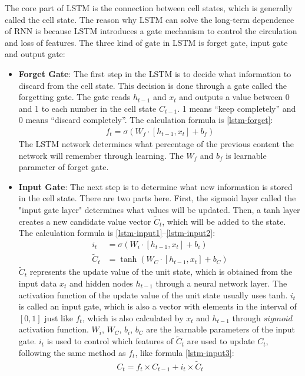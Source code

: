 The core part of LSTM is the connection between cell states, which is generally called the cell state. The reason why LSTM can solve the long-term dependence of RNN is because LSTM introduces a gate mechanism to control the circulation and loss of features. The three kind of gate in LSTM is forget gate, input gate and output gate:
\begin{itemize}
	\item \textbf{Forget Gate}: The first step in the LSTM is to decide what information to discard from the cell state. This decision is done through a gate called the forgetting gate. The gate reads \(h_{t-1}\) and \(x_t\) and outputs a value between 0 and 1 to each number in the cell state \(C_{t-1}\). 1 means ``keep completely'' and 0 means ``discard completely''. The calculation formula is \ref{lstm-forget}:
	      \begin{align}
		      f_{t}=\sigma(W_{f} \cdot[h_{t-1}, x_{t}]+b_{f}) \label{lstm-forget}
	      \end{align}
	      The LSTM network determines what percentage of the previous content the network will remember through learning. The \(W_f\) and \(b_f\) is learnable parameter of forget gate.
	\item \textbf{Input Gate}: The next step is to determine what new information is stored in the cell state. There are two parts here. First, the sigmoid layer called the "input gate layer" determines what values will be updated. Then, a tanh layer creates a new candidate value vector \(\widetilde{C}_t\), which will be added to the state. The calculation formula is \ref{lstm-input1}--\ref{lstm-input2}:
	      \begin{align}
		      i_{t}         & =\sigma(W_{i} \cdot[h_{t-1}, x_{t}]+b_{i}) \label{lstm-input1} \\
		      \tilde{C}_{t} & =\tanh (W_{C} \cdot[h_{t-1}, x_{t}]+b_{C}) \label{lstm-input2}
	      \end{align}
	      \(\tilde{C}_{t}\) represents the update value of the unit state, which is obtained from the input data \(x_t\) and hidden nodes \(h_{t-1}\) through a neural network layer. The activation function of the update value of the unit state usually uses tanh. $i_t$ is called an input gate, which is also a vector with elements in the interval of $[0,1]$ just like $f_t$, which is also calculated by $x_t$ and $h_{t-1}$ through $sigmoid$ activation function. $W_i$, $W_C$, $b_i$, $b_C$ are the learnable parameters of the input gate. $i_t$ is used to control which features of $\tilde{C}_{t}$ are used to update $C_t$, following the same method as $f_t$, like formula \ref{lstm-input3}:
	      \begin{align}
		      C_{t}=f_{t} \times C_{t-1}+i_{t} \times \tilde{C}_{t} \label{lstm-input3}
	      \end{align}


\end{itemize}
